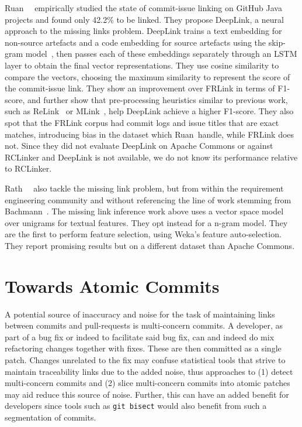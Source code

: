 Ruan~\etal~\cite{ruan2019deeplink} empirically studied the state of commit-issue
linking on GitHub Java projects and found only 42.2\% to be linked. They propose
DeepLink, a neural approach to the missing links problem. DeepLink trains a text
embedding for non-source artefacts and a code embedding for source artefacts
using the skip-gram model~\cite{mikolov2013efficient, mikolov2013distributed},
then passes each of these embeddings separately through an LSTM layer to obtain
the final vector representations. They use cosine similarity to compare the
vectors, choosing the maximum similarity to represent the score of the
commit-issue link. They show an improvement over FRLink in terms of F1-score,
and further show that pre-processing heuristics similar to previous work, such
as ReLink~\cite{relink} or MLink~\cite{MLink}, help DeepLink achieve a higher
F1-score. They also spot that the FRLink corpus had commit logs and issue titles
that are exact matches, introducing bias in the dataset which Ruan~\etal handle,
while FRLink does not. Since they did not evaluate DeepLink on Apache Commons or
against RCLinker and DeepLink is not available, we do not know its performance
relative to RCLinker.

Rath~\etal~\cite{1804.02433} also tackle the missing link problem, but from
within the requirement engineering community and without referencing the line of
work stemming from Bachmann~\etal. The missing link inference work above uses a
vector space model over unigrams for textual features. They opt instead for a
n-gram model. They are the first to perform feature selection, using Weka's
feature auto-selection. They report promising results but on a different dataset
than Apache Commons.


\section{Towards Atomic Commits}
\label{chapter:literature:sec:flexeme_rel_work}


A potential source of inaccuracy and noise for the task of maintaining links
between commits and pull-requests is multi-concern commits. A developer, as part
of a bug fix or indeed to facilitate said bug fix, can and indeed do mix
refactoring changes together with fixes. These are then committed as a single
patch. Changes unrelated to the fix may confuse statistical tools that strive to
maintain traceability links due to the added noise, thus approaches to (1)
detect multi-concern commits and (2) slice multi-concern commits into atomic
patches may aid reduce this source of noise. Further, this can have an added
benefit for developers since tools such as \lstinline+git bisect+ would also
benefit from such a segmentation of commits.

